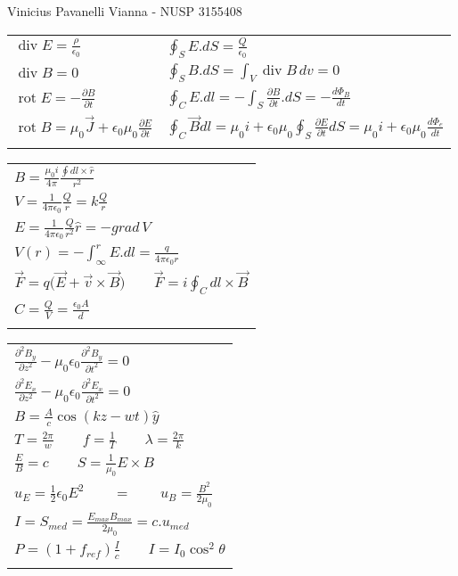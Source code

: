 \documentclass[a4paper]{article}
\DeclareMathOperator{\Div}{div}
\DeclareMathOperator{\Rot}{rot}
\newcommand{\parder}[2]{\frac{\partial {#1}}{\partial {#2}}}
\begin{document}
Vinicius Pavanelli Vianna - NUSP 3155408

\begin{tabular}{|l|l|}
\hline 
$ \Div E = \frac{\rho}{\epsilon_0} $ & $ \oint_S E.dS = \frac{Q}{\epsilon_0} $ \\
$ \Div B = 0 $ & $ \oint_S B.dS = \int_V \Div B \, dv = 0 $\\
$ \Rot E = -\parder{B}{t} $ & $ \oint_C E . dl = - \int_S \parder{B}{t}.dS = - \frac{d\Phi_B}{dt} $\\
$ \Rot B = \mu_0\vec{J} + \epsilon_0\mu_0\parder{E}{t} $ & $ \oint_C \vec{B} dl = \mu_0 i + \epsilon_0\mu_0 \oint_S \parder{E}{t} dS = \mu_0 i + \epsilon_0\mu_0 \frac{d\Phi_e}{dt} $\\
&\\
\hline
\end{tabular}
\begin{tabular}{|l|}
\hline
$ B = \frac{\mu_0 i }{4\pi}\frac{\oint dl \times \hat{r}}{r^2} $ \\
$ V = \frac{1}{4\pi\epsilon_0}\frac{Q}{r} = k \frac{Q}{r} $ \\
$ E = \frac{1}{4\pi\epsilon_0}\frac{Q}{r^2} \hat{r} = -grad\,V $ \\
$ V(r) = -\int_\infty^r E.dl = \frac{q}{4\pi\epsilon_0 r} $ \\
$ \vec{F} = q \big( \vec{E} + \vec{v} \times \vec{B} ) \qquad \vec{F} = i \oint_C dl \times \vec{B} $ \\
$ C = \frac{Q}{V} = \frac{\epsilon_0 A}{d} $ \\
\\
\hline
\end{tabular}
\begin{tabular}{|l|}
\hline
$ \frac{\partial^2 B_y}{\partial z^2} - \mu_0\epsilon_0 \frac{\partial^2 B_y}{\partial t^2} = 0 $ \\
$ \frac{\partial^2 E_x}{\partial z^2} - \mu_0\epsilon_0 \frac{\partial^2 E_x}{\partial t^2} = 0 $ \\
$ B = \frac{A}{c} \cos ( kz - wt) \hat{y} $ \\
$ T = \frac{2\pi}{w} \qquad f = \frac{1}{T} \qquad \lambda = \frac{2\pi}{k} $ \\
$ \frac{E}{B} = c \qquad S = \frac{1}{\mu_0} E \times B $ \\
$ u_E = \frac{1}{2}\epsilon_0E^2 \qquad = \qquad u_B = \frac{B^2}{2\mu_0} $ \\
$ I = S_{med} = \frac{E_{max}B_{max}}{2\mu_0} = c.u_{med} $ \\
$ P = (1+f_{ref})\frac{I}{c} \qquad I = I_0 \cos^2 \theta $ \\
\\
\hline
\end{tabular}
\end{document}
